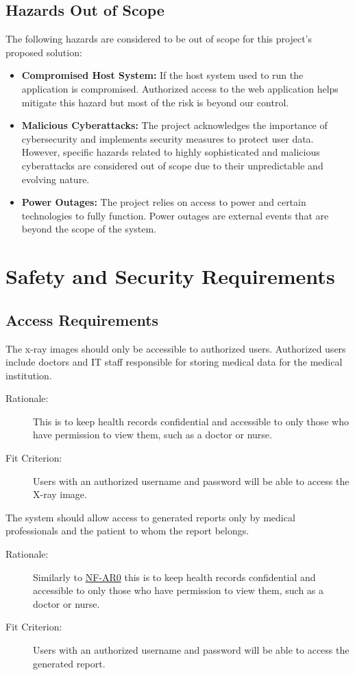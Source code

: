 \documentclass{article}
\begin{document}
\subsection{Hazards Out of Scope}
The following hazards are considered to be out of scope for this project's proposed solution:
\begin{itemize}
    \item \textbf{Compromised Host System:} If the host system used to run the application is compromised. Authorized access to the web application helps mitigate this hazard but most of the risk is beyond our control.
    \item \textbf{Malicious Cyberattacks:} The project acknowledges the importance of cybersecurity and implements security measures to protect user data. However, specific hazards related to highly sophisticated and malicious cyberattacks are considered out of scope due to their unpredictable and evolving nature.
    \item \textbf{Power Outages:} The project relies on access to power and certain technologies to fully function. Power outages are external events that are beyond the scope of the system.
\end{itemize} 


\section{Safety and Security Requirements}
\subsection{Access Requirements}
\begin{description}
\hypertarget{AR0}{}
    \item[AR0] The x-ray images should only be accessible to authorized users. Authorized users include doctors and IT staff responsible for storing medical data for the medical institution. 
    \begin{description}
        \item[Rationale:] This is to keep health records confidential and accessible to only those who have permission to view them, such as a doctor or nurse. 
        \item[Fit Criterion:] Users with an authorized username and password will be able to access the X-ray image.
    \end{description}
    \item[AR1] The system should allow access to generated reports only by medical professionals and the patient to whom the report belongs. 
    \begin{description}
        \item[Rationale:] Similarly to \hyperlink{AR0}{NF-AR0} this is to keep health records confidential and accessible to only those who have permission to view them, such as a doctor or nurse. 
        \item[Fit Criterion:] Users with an authorized username and password will be able to access the generated report.
    \end{description}
\end{description}
\end{document}

